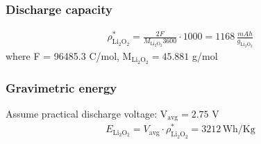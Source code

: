 \documentclass[12pt]{book}
\begin{document}
\subsubsection{Discharge capacity}
\begin{align}
\rho_{\textrm{Li}_2\textrm{O}_2}^* = \frac{2F}{M_{\textrm{Li}_2\textrm{O}_2} 3600}\cdot 1000 = 1168\,\frac{mAh}{g_{\textrm{Li}_2\textrm{O}_2}}
\end{align}
where F = 96485.3 C/mol, $\textrm{M}_{\textrm{Li}_2\textrm{O}_2} = 45.881$ g/mol
\subsubsection{Gravimetric energy}
Assume practical discharge voltage: V$_{\textrm{avg}} = 2.75$ V
\begin{align}
E_{\textrm{Li}_2\textrm{O}_2} = V_{\textrm{avg}}\cdot \rho_{\textrm{Li}_2\textrm{O}_2}^* = 3212\,\textrm{Wh/Kg}
\end{align}
\end{document}
